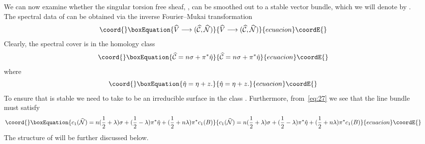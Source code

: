 \documentclass[a4paper,12pt]{article}
\numberwithin{equation}{section}
\def\cC{{\mathcal C}}
\def\cN{{\mathcal N}}
\theoremstyle{plain}
\begin{document}
We can now examine whether the singular torsion free sheaf, \coordHE{}, 
can be smoothed out to a stable \coordHE{} vector bundle, 
which we will denote by \coordHE{}. The spectral data of  
\coordHE{} can be
obtained via the inverse Fourier--Mukai transformation
\begin{equation}\coord{}\boxEquation{
\widehat{V} \longrightarrow (\widehat{\cC}, \widehat{\cN})
\label{eq:76}
}{
\widehat{V} \longrightarrow (\widehat{\cC}, \widehat{\cN})
}{ecuacion}\coordE{}\end{equation}
Clearly, the spectral cover \coordHE{} is in the homology class
\begin{equation}\coord{}\boxEquation{
\widehat{\cC} = n\sigma +\pi^{*}\hat{\eta}
\label{eq:77}
}{
\widehat{\cC} = n\sigma +\pi^{*}\hat{\eta}
}{ecuacion}\coordE{}\end{equation}
where
\begin{equation}\coord{}\boxEquation{
\hat{\eta}=\eta +z.
\label{eq:78}
}{
\hat{\eta}=\eta +z.
}{ecuacion}\coordE{}\end{equation}
To ensure that \coordHE{} is stable we need to take \myHighlight{$\widehat{\cC}$}\coordHE{}
to be an irreducible surface in the class \coordHE{}. 
Furthermore, from~\eqref{eq:27} we see that the line bundle
\myHighlight{$\widehat{\cN}$}\coordHE{} must satisfy 
\begin{equation}\coord{}\boxEquation{
c_{1}(\widehat{\cN})=n(\frac{1}{2}+\lambda)\sigma+(\frac{1}{2}-\lambda)
\pi^{*}\hat{\eta}+(\frac{1}{2}+n\lambda)\pi^{*}c_{1}(B)
\label{eq:79}
}{
c_{1}(\widehat{\cN})=n(\frac{1}{2}+\lambda)\sigma+(\frac{1}{2}-\lambda)
\pi^{*}\hat{\eta}+(\frac{1}{2}+n\lambda)\pi^{*}c_{1}(B)
}{ecuacion}\coordE{}\end{equation}
The structure of \myHighlight{$\widehat{\cN}$}\coordHE{} will be further discussed below.
\end{document}
